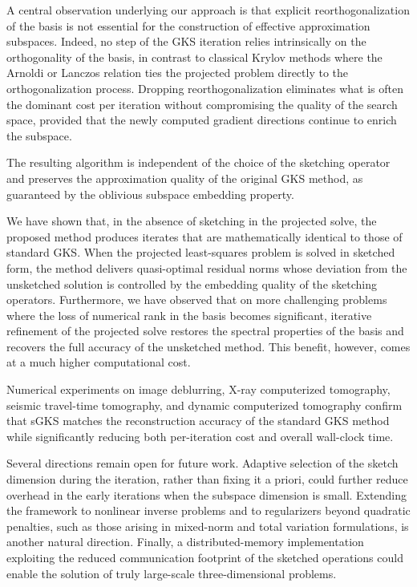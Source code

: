 \documentclass[%
  a4paper,
  onecolumn,
  colorlinks,
]{preprint}
\theoremstyle{plain}
\theoremstyle{definition}
\begin{document}
A central observation underlying our approach is that explicit reorthogonalization of the basis is not essential for the construction of effective approximation subspaces. Indeed, no step of the GKS iteration relies intrinsically on the orthogonality of the basis, in contrast to classical Krylov methods where the Arnoldi or Lanczos relation ties the projected problem directly to the orthogonalization process. Dropping reorthogonalization eliminates what is often the dominant cost per iteration without compromising the quality of the search space, provided that the newly computed gradient directions continue to enrich the subspace. 

The resulting algorithm is independent of the choice of the sketching operator and preserves the approximation quality of the original GKS method, as guaranteed by the oblivious subspace embedding property.

We have shown that, in the absence of sketching in the projected solve, the proposed method produces iterates that are mathematically identical to those of standard GKS. When the projected least-squares problem is solved in sketched form, the method delivers quasi-optimal residual norms whose deviation from the unsketched solution is controlled by the embedding quality of the sketching operators. Furthermore, we have observed that on more challenging problems where the loss of numerical rank in the basis becomes significant, iterative refinement of the projected solve restores the spectral properties of the basis and recovers the full accuracy of the unsketched method. This benefit, however, comes at a much higher computational cost.


Numerical experiments on image deblurring, X-ray computerized tomography, seismic travel-time tomography, and dynamic computerized tomography confirm that sGKS matches the reconstruction accuracy of the standard GKS method while significantly reducing both per-iteration cost and overall wall-clock time. 

Several directions remain open for future work. Adaptive selection of the sketch dimension during the iteration, rather than fixing it a priori, could further reduce overhead in the early iterations when the subspace dimension is small. Extending the framework to nonlinear inverse problems and to regularizers beyond quadratic penalties, such as those arising in mixed-norm and total variation formulations, is another natural direction. Finally, a distributed-memory implementation exploiting the reduced communication footprint of the sketched operations could enable the solution of truly large-scale three-dimensional problems.
\end{document}
